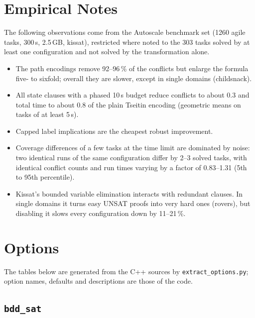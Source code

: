 \documentclass[manuscript, screen]{jair}
\newcommand{\opt}[1]{\texttt{#1}}
\newcommand{\bddsat}{\opt{bdd\_sat}\xspace}
\begin{document}
\section{Empirical Notes}\label{sec:empirical}

The following observations come from the Autoscale benchmark set \parencite{torralba-et-al-icaps2021}
(1260 agile tasks, 300\,s, 2.5\,GB, kissat), restricted where noted to the 303 tasks solved by at
least one configuration and not solved by the transformation alone.
\begin{itemize}
  \item The path encodings remove 92--96\,\% of the conflicts but enlarge the formula five- to
        sixfold; overall they are slower, except in single domains (childsnack).
  \item All state clauses with a phased 10\,s budget reduce conflicts to about 0.3 and total time to
        about 0.8 of the plain Tseitin encoding (geometric means on tasks of at least 5\,s).
  \item Capped label implications are the cheapest robust improvement.
  \item Coverage differences of a few tasks at the time limit are dominated by noise: two identical
        runs of the same configuration differ by 2--3 solved tasks, with identical conflict
        counts and run times varying by a factor of 0.83--1.31 (5th to 95th percentile).
  \item Kissat's bounded variable elimination interacts with redundant clauses. In single domains it
        turns easy UNSAT proofs into very hard ones (rovers), but disabling it slows every
        configuration down by 11--21\,\%.
\end{itemize}

\printbibliography

\appendix

\section{Options}

The tables below are generated from the C++ sources by \texttt{extract\_options.py}; option names,
defaults and descriptions are those of the code.

\subsection{\texorpdfstring{\bddsat}{bdd\_sat}}

\end{document}
